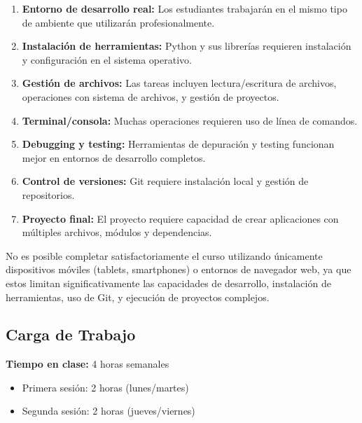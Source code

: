 \documentclass[12pt,letterpaper]{article}
\begin{document}
\begin{enumerate}[leftmargin=*]
    \item \textbf{Entorno de desarrollo real:} Los estudiantes trabajarán en el mismo tipo de ambiente que utilizarán profesionalmente.
    
    \item \textbf{Instalación de herramientas:} Python y sus librerías requieren instalación y configuración en el sistema operativo.
    
    \item \textbf{Gestión de archivos:} Las tareas incluyen lectura/escritura de archivos, operaciones con sistema de archivos, y gestión de proyectos.
    
    \item \textbf{Terminal/consola:} Muchas operaciones requieren uso de línea de comandos.
    
    \item \textbf{Debugging y testing:} Herramientas de depuración y testing funcionan mejor en entornos de desarrollo completos.
    
    \item \textbf{Control de versiones:} Git requiere instalación local y gestión de repositorios.
    
    \item \textbf{Proyecto final:} El proyecto requiere capacidad de crear aplicaciones con múltiples archivos, módulos y dependencias.
\end{enumerate}

\begin{notabox}
No es posible completar satisfactoriamente el curso utilizando únicamente dispositivos móviles (tablets, smartphones) o entornos de navegador web, ya que estos limitan significativamente las capacidades de desarrollo, instalación de herramientas, uso de Git, y ejecución de proyectos complejos.
\end{notabox}

\subsection{Carga de Trabajo}

\textbf{Tiempo en clase:} 4 horas semanales
\begin{itemize}[leftmargin=*]
    \item Primera sesión: 2 horas (lunes/martes)
    \item Segunda sesión: 2 horas (jueves/viernes)
\end{itemize}
\end{document}

